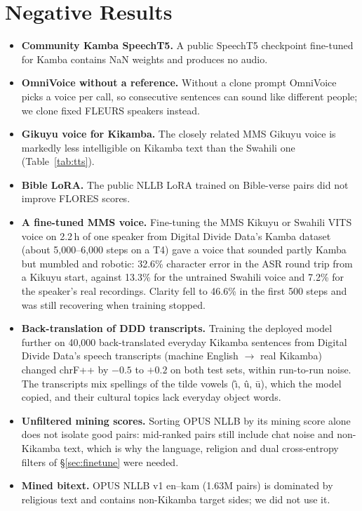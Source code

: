 \section{Negative Results}
\label{app:negative}

\begin{itemize}\itemsep0pt
  \item \textbf{Community Kamba SpeechT5.} A public SpeechT5 \citep{ao2022speecht5} checkpoint fine-tuned for Kamba contains NaN weights and produces no audio.
  \item \textbf{OmniVoice without a reference.} Without a clone prompt OmniVoice picks a voice per call, so consecutive sentences can sound like different people; we clone fixed FLEURS speakers instead.
  \item \textbf{Gikuyu voice for Kikamba.} The closely related MMS Gikuyu voice is markedly less intelligible on Kikamba text than the Swahili one (Table~\ref{tab:tts}).
  \item \textbf{Bible LoRA.} The public NLLB LoRA trained on Bible-verse pairs did not improve FLORES scores.
  \item \textbf{A fine-tuned MMS voice.} Fine-tuning the MMS Kikuyu or Swahili VITS voice on 2.2\,h of one speaker from Digital Divide Data's Kamba dataset (about 5,000--6,000 steps on a T4) gave a voice that sounded partly Kamba but mumbled and robotic: 32.6\% character error in the ASR round trip from a Kikuyu start, against 13.3\% for the untrained Swahili voice and 7.2\% for the speaker's real recordings. Clarity fell to 46.6\% in the first 500 steps and was still recovering when training stopped.
  \item \textbf{Back-translation of DDD transcripts.} Training the deployed model further on 40,000 back-translated everyday Kikamba sentences from Digital Divide Data's speech transcripts (machine English $\rightarrow$ real Kikamba) changed chrF++ by $-0.5$ to $+0.2$ on both test sets, within run-to-run noise. The transcripts mix spellings of the tilde vowels (\^{\i}, \^{u}, \={u}), which the model copied, and their cultural topics lack everyday object words.
  \item \textbf{Unfiltered mining scores.} Sorting OPUS NLLB by its mining score alone does not isolate good pairs: mid-ranked pairs still include chat noise and non-Kikamba text, which is why the language, religion and dual cross-entropy filters of \S\ref{sec:finetune} were needed.
  \item \textbf{Mined bitext.} OPUS NLLB v1 en--kam (1.63M pairs) is dominated by religious text and contains non-Kikamba target sides; we did not use it.
\end{itemize}

